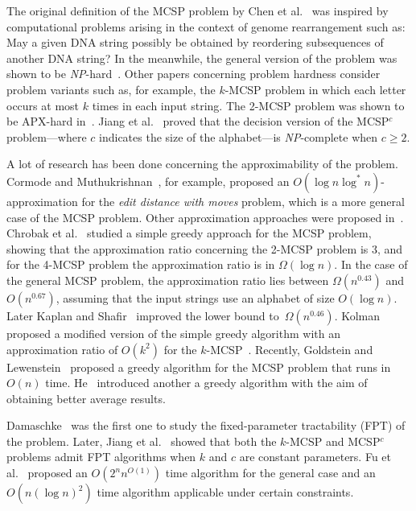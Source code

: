 \documentclass[11pt,a4paper]{article}
\begin{document}
The original definition of the MCSP problem by Chen et
al.~\cite{CheEtAl05:journal} was inspired by computational problems
arising in the context of genome rearrangement such as:
May a given DNA string possibly be obtained by reordering subsequences 
of another DNA string? 
In the meanwhile, the general version of the problem was shown to be
\emph{NP}-hard~\cite{Goldstein2004}. Other papers concerning problem
hardness consider problem variants such as, for example, the $k$-MCSP
problem in which each letter occurs at most $k$ times in each input
string. The 2-MCSP problem was shown to be APX-hard
in~\cite{Goldstein2004}. Jiang et al.~\cite{Jiang2010} proved that the
decision version of the MCSP$^c$ problem---where $c$ indicates the size
of the alphabet---is \emph{NP}-complete when $c \geq 2$.

A lot of research has been done concerning the approximability of the
problem. Cormode and Muthukrishnan~\cite{Cormode2002}, for example,
proposed an $O(\log n \log^*n)$-approximation for the \emph{edit distance
with moves} problem, which is a more general case of the MCSP problem.
Other approximation approaches were proposed
in~\cite{Shapira2002,Kolman2007}. Chrobak et al.~\cite{Chrobak2004}
studied a simple greedy approach for the MCSP problem, showing that the
approximation ratio concerning the 2-MCSP problem is 3, and for the
4-MCSP problem the approximation ratio is in $\Omega(\log n)$. In the case
of the general MCSP problem, the approximation ratio lies between
$\Omega(n^{0.43})$ and $O(n^{0.67})$, assuming that the input strings
use an alphabet of size $O(\log n)$. Later Kaplan and
Shafir~\cite{Kaplan2006} improved the lower bound to~$\Omega(n^{0.46})$.
Kolman proposed a modified version of the simple greedy algorithm with
an approximation ratio of $O(k^2)$ for the $k$-MCSP~\cite{Kolman2005}.
Recently, Goldstein and Lewenstein~\cite{Goldstein2011} proposed a
greedy algorithm for the MCSP problem that runs in $O(n)$ time.
He~\cite{He2007} introduced another a greedy algorithm with the aim of
obtaining better average results.

Damaschke~\cite{raey} was the first one to study the fixed-parameter
tractability (FPT) of the problem. Later, Jiang et al.~\cite{Jiang2010}
showed that both the $k$-MCSP and MCSP$^c$ problems admit FPT algorithms
when $k$ and $c$ are constant parameters. Fu et al.~\cite{BinFu2011}
proposed an $O(2^nn^{O(1)})$ time algorithm for the general case and an
$O(n(\log n)^2)$ time algorithm applicable under certain constraints. 
\end{document}
